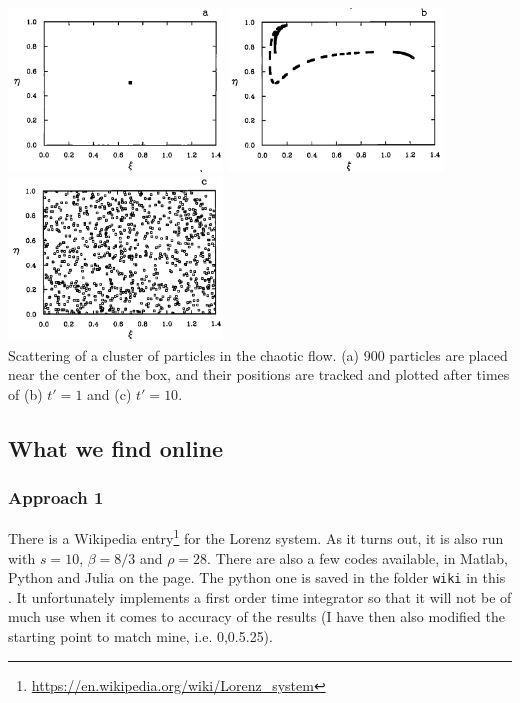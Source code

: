 \begin{center}
\includegraphics[width=5.7cm]{python_codes/fieldstone_156/images/ketu90e}
\includegraphics[width=5.7cm]{python_codes/fieldstone_156/images/ketu90f}
\includegraphics[width=5.7cm]{python_codes/fieldstone_156/images/ketu90g}\\
{
Scattering of a cluster of particles in the chaotic flow.
(a) 900 particles are placed near the center of the box, 
and their positions are tracked and plotted after times 
of (b) $t'=1$ and (c) $t'=10$.
}
\end{center}

\subsection*{What we find online}

\subsubsection*{Approach 1}

There is a Wikipedia entry\footnote{\url{https://en.wikipedia.org/wiki/Lorenz_system}} 
for the Lorenz system.
As it turns out, it is also run with $s=10$, $\beta=8/3$ and $\rho=28$.
There are also a few codes available, in Matlab, Python and Julia on the page. 
The python one is saved in the folder {\tt wiki} in this \stone. 
It unfortunately implements a first order time integrator so that it will
not be of much use when it comes to accuracy of the results
(I have then also modified the starting point to match mine, i.e. 0,0.5.25).

